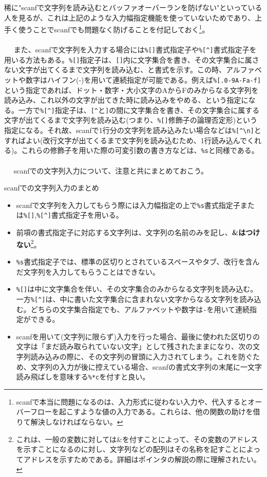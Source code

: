 稀に"scanfで文字列を読み込むとバッファオーバーランを防げない"といっている人を見るが、これは上記のような入力幅指定機能を使っていないためであり、上手く使うことでscanfでも問題なく防げることを付記しておく\footnote{scanfで本当に問題になるのは、入力形式に従わない入力や、代入するとオーバーフローを起こすような値の入力である。これらは、他の関数の助けを借りて解決しなければならない。}。
\\ \\　
また、scanfで文字列を入力する場合には\verb|%[]|書式指定子や\verb|%[^]|書式指定子を用いる方法もある。\verb|%[]|指定子は、\verb|[]|内に文字集合を書き、その文字集合に属さない文字が出てくるまで文字列を読み込む、と書式を示す。この時、アルファベットや数字はハイフン(-)を用いて連続指定が可能である。例えば\verb|%[.0-9A-Fa-f]|という指定であれば、ドット・数字・大小文字のAからFのみからなる文字列を読み込み、これ以外の文字が出てきた時に読み込みをやめる、という指定になる。一方で\verb|%[^]|指定子は、\verb|[^|と\verb|]|の間に文字集合を書き、その文字集合に属する文字が出てくるまで文字列を読み込む(つまり、\verb|%[]|修飾子の論理否定形)という指定になる。それ故、scanfで1行分の文字列を読み込みたい場合などは\verb|%[^\n]|とすればよい(改行文字が出てくるまで文字列を読み込むため、1行読み込んでくれる)。これらの修飾子を用いた際の可変引数の書き方などは、\verb|%s|と同様である。
\\ \\　
scanfでの文字列入力について、注意と共にまとめておこう。
\begin{itembox}[l]{scanfでの文字列入力のまとめ}
\begin{itemize}
\item scanfで文字列を入力してもらう際には入力幅指定の上で\verb|%s|書式指定子または\verb|%[]|,\verb|%[^]|書式指定子を用いる。
\item 前項の書式指定子に対応する文字列は、文字列の名前のみを記し、\textbf{\&はつけない}\footnote{これは、一般の変数に対しては\&を付すことによって、その変数のアドレスを示すことになるのに対し、文字列などの配列はその名称を記すことによってアドレスを示すためである。詳細はポインタの解説の際に理解されたい。}。
\item \verb|%s|書式指定子では、標準の区切りとされているスペースやタブ、改行を含んだ文字列を入力してもらうことはできない。
\item \verb|%[]|は中に文字集合を伴い、その文字集合のみからなる文字列を読み込む。一方\verb|%[^]|は、中に書いた文字集合に含まれない文字からなる文字列を読み込む。どちらの文字集合指定でも、アルファベットや数字は\verb|-|を用いて連続指定ができる。
\item scanfを用いて(文字列に限らず)入力を行った場合、最後に使われた区切りの文字は「まだ読み取られていない文字」として残されたままになり、次の文字列読み込みの際に、その文字列の冒頭に入力されてしまう。これを防ぐため、文字列の入力が後に控えている場合、scanfの書式文字列の末尾に一文字読み飛ばしを意味する\verb|%*c|を付すと良い。
\end{itemize}
\end{itembox}
